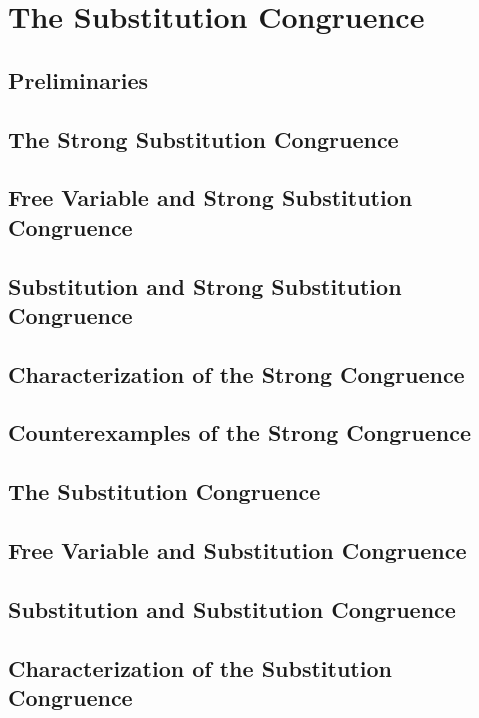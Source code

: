 \documentclass{report}
\begin{document}
\section{The Substitution Congruence}
    \subsection{Preliminaries}
      
    \subsection{The Strong Substitution Congruence}
      
    \subsection{Free Variable and Strong Substitution Congruence}
      
    \subsection{Substitution and Strong Substitution Congruence}
      
    \subsection{Characterization of the Strong Congruence}
      
    \subsection{Counterexamples of the Strong Congruence}
      
    \subsection{The Substitution Congruence}
      
    \subsection{Free Variable and Substitution Congruence}
      
    \subsection{Substitution and Substitution Congruence}
      
    \subsection{Characterization of the Substitution Congruence}
      
\end{document}
